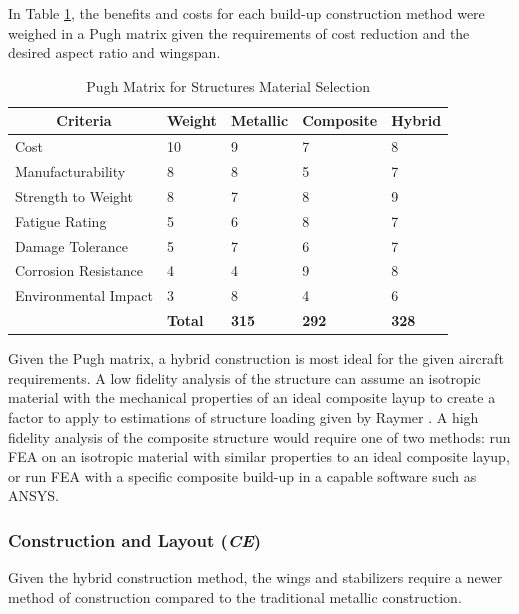 \FloatBarrier
In Table \ref{tab:pugh_structures}, the benefits and costs for each build-up construction method were weighed in a Pugh matrix given the requirements of cost reduction and the desired aspect ratio and wingspan.

\begin{table}[!h]
\centering
\caption{Pugh Matrix for Structures Material Selection}
\begin{tabular}{|p{3.5cm}||p{3cm}|p{2cm}|p{2cm}|p{2cm}| }
\toprule
\multicolumn{1}{|c||}{\textbf{Criteria}} & \multicolumn{1}{c|}{\textbf{Weight}} &  
\multicolumn{1}{c|}{\textbf{Metallic}} & \multicolumn{1}{c|}{\textbf{Composite}} & \multicolumn{1}{c|}{\textbf{Hybrid}} \\ \hline \hline 
Cost & 10 & 9 & 7 & 8 \\ \hline
Manufacturability & 8 & 8 & 5 & 7 \\  \hline
Strength to Weight & 8 & 7 & 8 & 9 \\  \hline
Fatigue Rating & 5 & 6 & 8 & 7 \\  \hline
Damage Tolerance & 5 & 7 & 6 & 7 \\  \hline
Corrosion Resistance & 4 & 4 & 9 & 8 \\  \hline
Environmental Impact & 3 & 8 & 4 & 6 \\  \hline \hline
 & \textbf{Total} & \textbf{315} & \textbf{292} & \textbf{328} \\
\bottomrule
\end{tabular}
\label{tab:pugh_structures}
\end{table}
\FloatBarrier

Given the Pugh matrix, a hybrid construction is most ideal for the given aircraft requirements. A low fidelity analysis of the structure can assume an isotropic material with the mechanical properties of an ideal composite layup to create a factor to apply to estimations of structure loading given by Raymer \cite{raymer}. A high fidelity analysis of the composite structure would require one of two methods: run FEA on an isotropic material with similar properties to an ideal composite layup, or run FEA with a specific composite build-up in a capable software such as ANSYS.

\subsubsection{Construction and Layout (\textit{CE})}
Given the hybrid construction method, the wings and stabilizers require a newer method of construction compared to the traditional metallic construction. 

